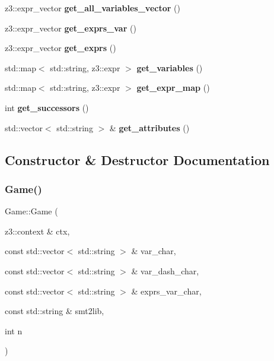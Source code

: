 \begin{DoxyCompactItemize}
z3\+::expr\+\_\+vector {\bfseries get\+\_\+all\+\_\+variables\+\_\+vector} ()
\item 
\mbox{\label{classGame_abf8cdc443e10c1038a644a2f3d5ab70f}} 
z3\+::expr\+\_\+vector {\bfseries get\+\_\+exprs\+\_\+var} ()
\item 
\mbox{\label{classGame_a9f17d224ff020a442dbd44b481a10d93}} 
z3\+::expr\+\_\+vector {\bfseries get\+\_\+exprs} ()
\item 
\mbox{\label{classGame_a6fdcd6543693b71ae7080fc2cebd251f}} 
std\+::map$<$ std\+::string, z3\+::expr $>$ {\bfseries get\+\_\+variables} ()
\item 
\mbox{\label{classGame_a40e4c2b72f3c3facb9e361a8951984a6}} 
std\+::map$<$ std\+::string, z3\+::expr $>$ {\bfseries get\+\_\+expr\+\_\+map} ()
\item 
\mbox{\label{classGame_a9bb60a5d9bd93eaa7a7c9efe24df7ab0}} 
int {\bfseries get\+\_\+successors} ()
\item 
\mbox{\label{classGame_a5290c5e9b5a8e114b7a1e1a7803805bf}} 
std\+::vector$<$ std\+::string $>$ \& {\bfseries get\+\_\+attributes} ()
\end{DoxyCompactItemize}


\subsection{Constructor \& Destructor Documentation}
\mbox{\label{classGame_a1051ad3ca91f98eade1fe84c68ec721b}} 
\subsubsection{\texorpdfstring{Game()}{Game()}}
{\footnotesize\ttfamily Game\+::\+Game (\begin{DoxyParamCaption}\item[{z3\+::context \&}]{ctx,  }\item[{const std\+::vector$<$ std\+::string $>$ \&}]{var\+\_\+char,  }\item[{const std\+::vector$<$ std\+::string $>$ \&}]{var\+\_\+dash\+\_\+char,  }\item[{const std\+::vector$<$ std\+::string $>$ \&}]{exprs\+\_\+var\+\_\+char,  }\item[{const std\+::string \&}]{smt2lib,  }\item[{int}]{n }\end{DoxyParamCaption})\hspace{0.3cm}{\ttfamily [inline]}}

